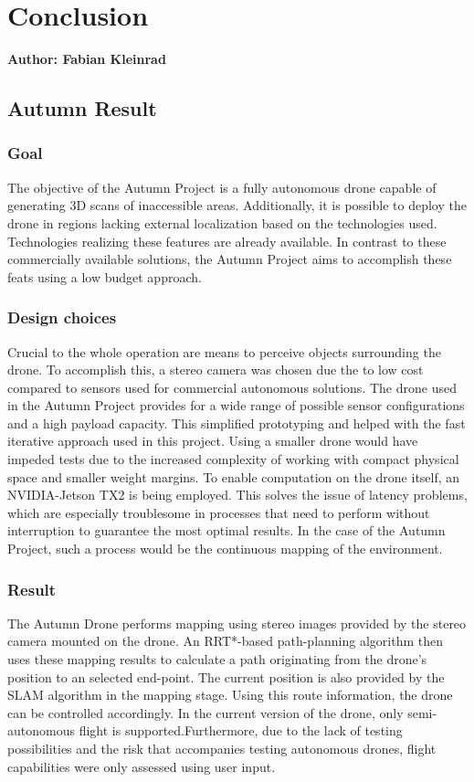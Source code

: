 \chapter{Conclusion}

\textbf{Author: Fabian Kleinrad} 

\section{Autumn Result}

\subsection{Goal}
The objective of the Autumn Project is a fully autonomous drone capable of generating 3D scans of inaccessible areas. Additionally, it is possible to deploy the drone in regions lacking external localization based on the technologies used. Technologies realizing these features are already available. In contrast to these commercially available solutions, the Autumn Project aims to accomplish these feats using a low budget approach. 

\subsection{Design choices}
Crucial to the whole operation are means to perceive objects surrounding the drone. To accomplish this, a stereo camera was chosen due the to low cost compared to sensors used for commercial autonomous solutions.\newline
The drone used in the Autumn Project provides for a wide range of possible sensor configurations and a high payload capacity. This simplified prototyping and helped with the fast iterative approach used in this project. Using a smaller drone would have impeded tests due to the increased complexity of working with compact physical space and smaller weight margins.\newline
To enable computation on the drone itself, an NVIDIA-Jetson TX2 is being employed. This solves the issue of latency problems, which are especially troublesome in processes that need to perform without interruption to guarantee the most optimal results. In the case of the Autumn Project, such a process would be the continuous mapping of the environment.
\pagebreak
\subsection{Result}
The Autumn Drone performs mapping using stereo images provided by the stereo camera mounted on the drone. An RRT*-based path-planning algorithm then uses these mapping results to calculate a path originating from the drone's position to an selected end-point. The current position is also provided by the SLAM algorithm in the mapping stage. Using this route information, the drone can be controlled accordingly.
In the current version of the drone, only semi-autonomous flight is supported.Furthermore, due to the lack of testing possibilities and the risk that accompanies testing autonomous drones, flight capabilities were only assessed using user input.

